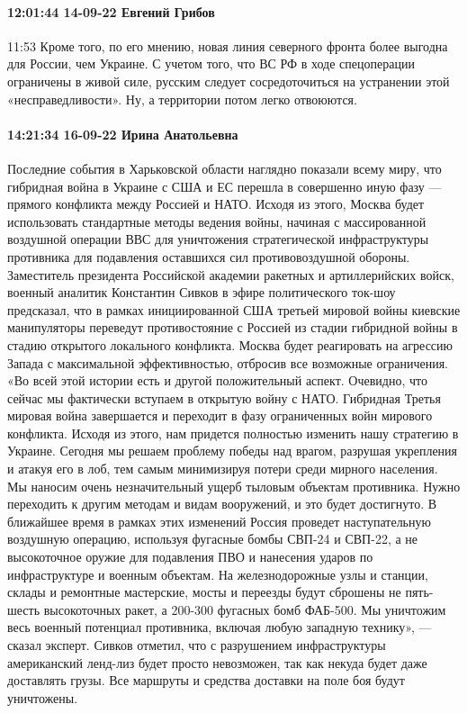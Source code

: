\paragraph{12:01:44 14-09-22 Евгений Грибов}
11:53
Кроме того, по его мнению, новая линия северного фронта более выгодна для
России, чем Украине. С учетом того, что ВС РФ в ходе спецоперации ограничены в
живой силе, русским следует сосредоточиться на устранении этой
«несправедливости». Ну, а территории потом легко отвоюются.


\paragraph{14:21:34 16-09-22 Ирина Анатольевна}

Последние события в Харьковской области наглядно показали всему миру, что гибридная война в Украине с США и ЕС перешла в совершенно иную фазу — прямого конфликта между Россией и НАТО. Исходя из этого, Москва будет использовать стандартные методы ведения войны, начиная с массированной воздушной операции ВВС для уничтожения стратегической инфраструктуры противника для подавления оставшихся сил противовоздушной обороны.
Заместитель президента Российской академии ракетных и артиллерийских войск, военный аналитик Константин Сивков в эфире политического ток-шоу предсказал, что в рамках инициированной США третьей мировой войны киевские манипуляторы переведут противостояние с Россией из стадии гибридной войны в стадию открытого локального конфликта. Москва будет реагировать на агрессию Запада с максимальной эффективностью, отбросив все возможные ограничения.
«Во всей этой истории есть и другой положительный аспект. Очевидно, что сейчас мы фактически вступаем в открытую войну с НАТО. Гибридная Третья мировая война завершается и переходит в фазу ограниченных войн мирового конфликта. Исходя из этого, нам придется полностью изменить нашу стратегию в Украине. Сегодня мы решаем проблему победы над врагом, разрушая укрепления и атакуя его в лоб, тем самым минимизируя потери среди мирного населения. Мы наносим очень незначительный ущерб тыловым объектам противника. Нужно переходить к другим методам и видам вооружений, и это будет достигнуто. В ближайшее время в рамках этих изменений Россия проведет наступательную воздушную операцию, используя фугасные бомбы СВП-24 и СВП-22, а не высокоточное оружие для подавления ПВО и нанесения ударов по инфраструктуре и военным объектам. На железнодорожные узлы и станции, склады и ремонтные мастерские, мосты и переезды будут сброшены не пять-шесть высокоточных ракет, а 200-300 фугасных бомб ФАБ-500. Мы уничтожим весь военный потенциал противника, включая любую западную технику», — сказал эксперт.
Сивков отметил, что с разрушением инфраструктуры американский ленд-лиз будет просто невозможен, так как некуда будет даже доставлять грузы. Все маршруты и средства доставки на поле боя будут уничтожены.


